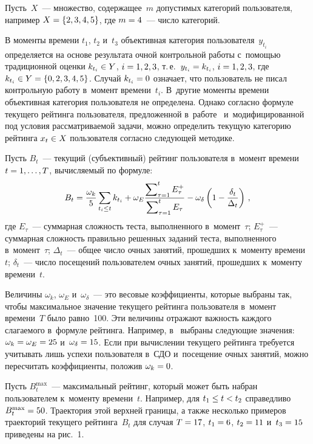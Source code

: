 \begin{multicols}{2}
      Пусть~$X$~--- множество, содержащее~$m$ до\-пус\-ти\-мых категорий пользователя, 
например $X\hm= \{2, 3, 4, 5\}$, где $m\hm=4$~--- число категорий.
      
      В моменты времени $t_1$, $t_2$ и~$t_3$ объективная категория пользователя~$y_{t_i}$ 
определяется на основе результата очной контрольной работы с~помощью традиционной 
оценки $k_{t_i}\hm\in Y$, $i\hm= 1,2,3$, т.\,е.\ $y_{t_i}\hm=k_{t_i}$, $i\hm= 1,2,3$,  где 
$k_{t_i}\hm\in Y\hm= \{0,2,3,4,5\}$. Случай $k_{t_i}\hm=0$ означает, что пользователь не 
писал контрольную работу в~момент времени~$t_i$. В~другие моменты времени 
объективная категория пользователя не определена. Однако согласно формуле текущего 
рейтинга пользователя, предложенной в~работе~\cite{15-bos} и~модифицированной под 
условия рассматриваемой задачи, можно определить текущую категорию рейтинга 
$x_t\hm\in X$ пользователя согласно следующей методике.
      
      Пусть $B_t$~--- текущий (субъективный) рейтинг пользователя в~момент времени 
$t\hm= 1,\ldots , T$, вы\-чис\-ля\-емый по формуле:
      \begin{equation*}
      B_t=\displaystyle\frac{\displaystyle \omega_k\mathstrut}{\displaystyle 5\mathstrut} \sum\limits_{t_i\leq t} k_{t_i} +\omega_E 
\displaystyle\frac{\displaystyle \sum\nolimits_{\tau=1}^t E_\tau^+ \mathstrut}{\displaystyle \sum\nolimits^t_{\tau=1} E_\tau\mathstrut} -
\omega_\delta \left( 1-
\displaystyle\frac{\displaystyle \delta_t\mathstrut}{\displaystyle \Delta_t\mathstrut}\right)\,,
      \end{equation*}
где $E_\tau$~--- суммарная сложность теста, выполненного в~момент~$\tau$;  
$E_\tau^+$~--- суммарная сложность правильно решенных заданий теста, выполненного 
в~момент~$\tau$; $\Delta_t$~--- общее число очных занятий, прошедших к~моменту 
времени~$t$; $\delta_t$~--- число посещений пользователем очных занятий, прошедших 
к~моменту времени~$t$.

      Величины $\omega_k$, $\omega_E$ и~$\omega_\delta$~--- это весовые 
коэффициенты, которые выбраны так, чтобы максимальное значение текущего рейтинга 
пользователя в~момент времени~$T$ было равно~100. Эти величины отражают 
важность каждого слагаемого в~формуле рейтинга. Например, в~\cite{15-bos} выбраны 
следующие значения: $\omega_k\hm=\omega_E\hm=25$ и~$\omega_\delta\hm=15$. Если при 
вычислении текущего рейтинга требуется учитывать лишь успехи пользователя в~СДО 
и~посещение очных занятий, можно пересчитать коэффициенты, положив 
$\omega_k\hm=0$.
      
      Пусть $B_t^{\max}$~--- максимальный рейтинг, который может быть набран 
пользователем к~моменту времени~$t$. Например, для $t_1\hm\leq t \hm< t_2$ справедливо 
$B_t^{\max}\hm=50$. Траектория этой верхней границы, а также несколько примеров 
траекторий текущего рейтинга~$B_t$  для случая $T\hm=17$, $t_1\hm=6$, $t_2\hm=11$ 
и~$t_3\hm=15$ приведены на рис.~1.


\end{multicols}
